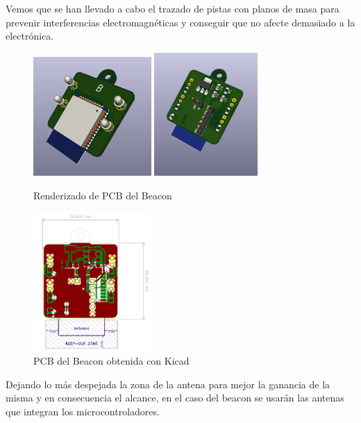 \documentclass[paper=a4, fontsize=11pt,twoside]{scrartcl}	%
\begin{document}
        Vemos que se han llevado a cabo el trazado de pistas con planos de masa para prevenir interferencias electromagnéticas
        y conseguir que no afecte demasiado a la electrónica.
        \begin{center}
            \begin{figure}[ht]
                \centering
                \includegraphics[width=0.4\textwidth]{../emiter_1.PNG}
                \includegraphics[width=0.35\textwidth]{../emiter_2.PNG}
                \caption{Renderizado de PCB del Beacon}
                \label{fig:mesh8}
            \end{figure}    
        \end{center}
        \begin{center}
            \begin{figure}[ht]
                \centering
                \includegraphics[width=0.40\textwidth]{../emiter_PCB.PNG}
                \caption{PCB del Beacon obtenida con Kicad}
                \label{fig:mesh9}
            \end{figure}    
        \end{center}
        Dejando lo más despejada la zona de la antena para mejor la ganancia de la misma y en consecuencia el alcance, en el caso 
        del beacon se usarán las antenas que integran los microcontroladores.
\end{document}
